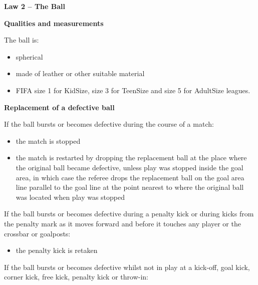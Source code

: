 \clearpage
\sffamily
{\bfseries\color[rgb]{0.4,0.4,0.4}
Law 2 -- The Ball}


\bigskip

{\bfseries Qualities and measurements }

\headlinebox

The ball is:

\begin{itemize}
\item spherical
\item made of leather or other suitable material
\item FIFA size 1 for KidSize, size 3 for TeenSize and size 5 for AdultSize leagues. 
\end{itemize}

{\bfseries Replacement of a defective ball }

\headlinebox

If the ball bursts or becomes defective during the course of a match:

\begin{itemize}
\item the match is stopped
\item the match is restarted by dropping the replacement ball at the place where the original ball became defective, unless play was stopped inside the goal area, in which case the referee drops the replacement ball on the goal area line parallel to the goal line at the point
nearest to where the original ball was located when play was stopped
\end{itemize}

If the ball bursts or becomes defective during a penalty kick or during kicks from the penalty mark as it moves forward and before it touches any player or the crossbar or goalposts: 

\begin{itemize}
\item the penalty kick is retaken
\end{itemize}

If the ball bursts or becomes defective whilst not in play at a kick-off, goal kick, corner kick, free kick, penalty kick or throw-in:


